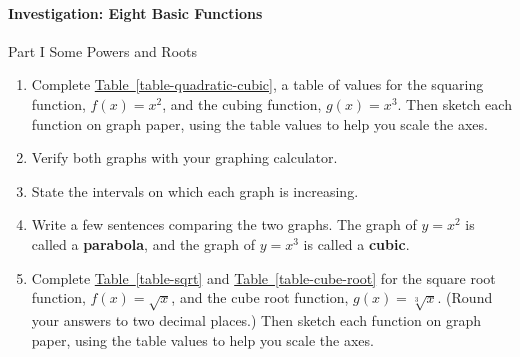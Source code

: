 \documentclass[10pt,]{book}
\newcommand{\terminology}[1]{\textbf{#1}}
\theoremstyle{plain}
\theoremstyle{definition}
\theoremstyle{definition}
\theoremstyle{definition}
\theoremstyle{definition}
\theoremstyle{definition}
\numberwithin{equation}{section}
\begin{document}
\paragraph[Investigation: Eight Basic Functions]{Investigation: Eight Basic Functions}\label{paragraphs-25}
%
\par
Part I Some Powers and Roots%
\leavevmode%
\begin{enumerate}
\item\hypertarget{li-259}{}Complete \hyperref[table-quadratic-cubic]{Table~\ref{table-quadratic-cubic}}, a table of values for the squaring function, \(f (x) = x^2\), and the cubing function, \(g(x) = x^3\). Then sketch each function on graph paper, using the table values to help you scale the axes.\item\hypertarget{li-260}{}Verify both graphs with your graphing calculator.\item\hypertarget{li-261}{}State the intervals on which each graph is increasing.\item\hypertarget{li-262}{}Write a few sentences comparing the two graphs. The graph of \(y = x^2\) is called a \terminology{parabola}, and the graph of \(y = x^3\) is called a \terminology{cubic}.\item\hypertarget{li-263}{}Complete \hyperref[table-sqrt]{Table~\ref{table-sqrt}} and \hyperref[table-cube-root]{Table~\ref{table-cube-root}} for the square root function, \(f (x) = \sqrt{x}\), and the cube root function, \(g(x) = \sqrt[3]{x} \). (Round your answers to two decimal places.) Then sketch each function on graph paper, using the table values to help you scale the axes.


\end{enumerate}
\end{document}
